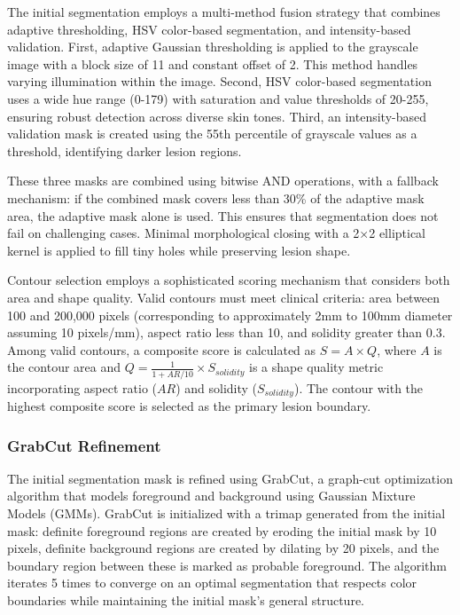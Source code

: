 \documentclass[conference]{IEEEtran}
\begin{document}
The initial segmentation employs a multi-method fusion strategy that combines adaptive thresholding, HSV color-based segmentation, and intensity-based validation. First, adaptive Gaussian thresholding is applied to the grayscale image with a block size of 11 and constant offset of 2. This method handles varying illumination within the image. Second, HSV color-based segmentation uses a wide hue range (0-179) with saturation and value thresholds of 20-255, ensuring robust detection across diverse skin tones. Third, an intensity-based validation mask is created using the 55th percentile of grayscale values as a threshold, identifying darker lesion regions.

These three masks are combined using bitwise AND operations, with a fallback mechanism: if the combined mask covers less than 30\% of the adaptive mask area, the adaptive mask alone is used. This ensures that segmentation does not fail on challenging cases. Minimal morphological closing with a 2×2 elliptical kernel is applied to fill tiny holes while preserving lesion shape.

Contour selection employs a sophisticated scoring mechanism that considers both area and shape quality. Valid contours must meet clinical criteria: area between 100 and 200,000 pixels (corresponding to approximately 2mm to 100mm diameter assuming 10 pixels/mm), aspect ratio less than 10, and solidity greater than 0.3. Among valid contours, a composite score is calculated as $S = A \times Q$, where $A$ is the contour area and $Q = \frac{1}{1 + AR/10} \times S_{solidity}$ is a shape quality metric incorporating aspect ratio ($AR$) and solidity ($S_{solidity}$). The contour with the highest composite score is selected as the primary lesion boundary.

\subsubsection{GrabCut Refinement}

The initial segmentation mask is refined using GrabCut, a graph-cut optimization algorithm that models foreground and background using Gaussian Mixture Models (GMMs). GrabCut is initialized with a trimap generated from the initial mask: definite foreground regions are created by eroding the initial mask by 10 pixels, definite background regions are created by dilating by 20 pixels, and the boundary region between these is marked as probable foreground. The algorithm iterates 5 times to converge on an optimal segmentation that respects color boundaries while maintaining the initial mask's general structure.
\end{document}
